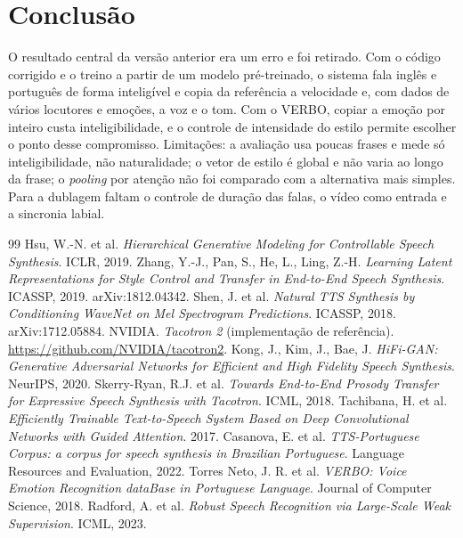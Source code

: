 \documentclass[twocolumn,a4paper,10pt]{article}
\begin{document}
\section{Conclusão}
O resultado central da versão anterior era um erro e foi retirado. Com o código corrigido e o treino a partir de um modelo pré-treinado, o sistema fala inglês e português de forma inteligível e copia da referência a velocidade e, com dados de vários locutores e emoções, a voz e o tom. Com o VERBO, copiar a emoção por inteiro custa inteligibilidade, e o controle de intensidade do estilo permite escolher o ponto desse compromisso. Limitações: a avaliação usa poucas frases e mede só inteligibilidade, não naturalidade; o vetor de estilo é global e não varia ao longo da frase; o \textit{pooling} por atenção não foi comparado com a alternativa mais simples. Para a dublagem faltam o controle de duração das falas, o vídeo como entrada e a sincronia labial.

\begin{thebibliography}{99}\footnotesize\setlength{\itemsep}{1pt}\setlength{\parskip}{0pt}
 Hsu, W.-N. et al. \textit{Hierarchical Generative Modeling for Controllable Speech Synthesis}. ICLR, 2019.
 Zhang, Y.-J., Pan, S., He, L., Ling, Z.-H. \textit{Learning Latent Representations for Style Control and Transfer in End-to-End Speech Synthesis}. ICASSP, 2019. arXiv:1812.04342.
 Shen, J. et al. \textit{Natural TTS Synthesis by Conditioning WaveNet on Mel Spectrogram Predictions}. ICASSP, 2018. arXiv:1712.05884.
 NVIDIA. \textit{Tacotron 2} (implementação de referência). \url{https://github.com/NVIDIA/tacotron2}.
 Kong, J., Kim, J., Bae, J. \textit{HiFi-GAN: Generative Adversarial Networks for Efficient and High Fidelity Speech Synthesis}. NeurIPS, 2020.
 Skerry-Ryan, R.J. et al. \textit{Towards End-to-End Prosody Transfer for Expressive Speech Synthesis with Tacotron}. ICML, 2018.
 Tachibana, H. et al. \textit{Efficiently Trainable Text-to-Speech System Based on Deep Convolutional Networks with Guided Attention}. 2017.
 Casanova, E. et al. \textit{TTS-Portuguese Corpus: a corpus for speech synthesis in Brazilian Portuguese}. Language Resources and Evaluation, 2022.
 Torres Neto, J. R. et al. \textit{VERBO: Voice Emotion Recognition dataBase in Portuguese Language}. Journal of Computer Science, 2018.
 Radford, A. et al. \textit{Robust Speech Recognition via Large-Scale Weak Supervision}. ICML, 2023.
\end{thebibliography}
\end{document}
